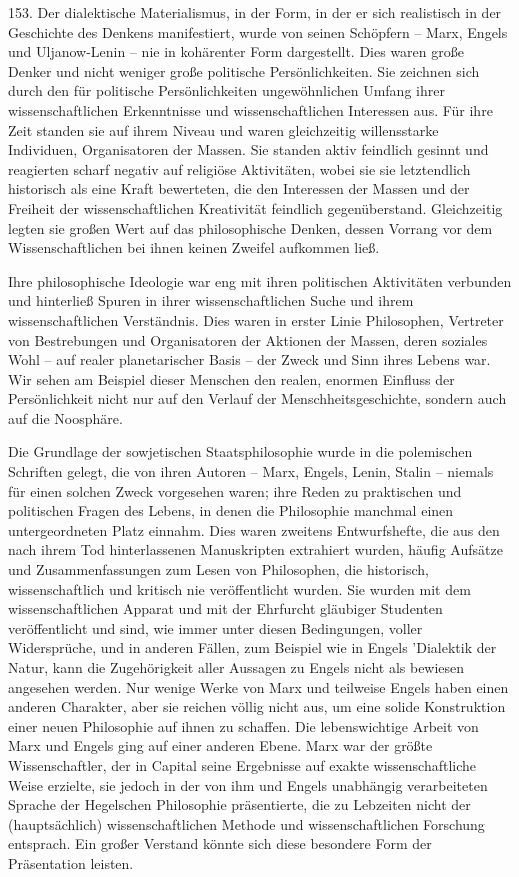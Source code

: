 \documentclass[11pt,a4paper]{book}
\begin{document}
153. Der dialektische Materialismus, in der Form, in der er sich realistisch in der Geschichte des Denkens manifestiert, wurde von seinen Schöpfern -- Marx, Engels und Uljanow-Lenin -- nie in kohärenter Form dargestellt. Dies waren große Denker und nicht weniger große politische Persönlichkeiten. Sie zeichnen sich durch den für politische Persönlichkeiten ungewöhnlichen Umfang ihrer wissenschaftlichen Erkenntnisse und wissenschaftlichen Interessen aus. Für ihre Zeit standen sie auf ihrem Niveau und waren gleichzeitig willensstarke Individuen, Organisatoren der Massen. Sie standen aktiv feindlich gesinnt und reagierten scharf negativ auf religiöse Aktivitäten, wobei sie sie letztendlich historisch als eine Kraft bewerteten, die den Interessen der Massen und der Freiheit der wissenschaftlichen Kreativität feindlich gegenüberstand. Gleichzeitig legten sie großen Wert auf das philosophische Denken, dessen Vorrang vor dem Wissenschaftlichen bei ihnen keinen Zweifel aufkommen ließ.



Ihre philosophische Ideologie war eng mit ihren politischen Aktivitäten verbunden und hinterließ Spuren in ihrer wissenschaftlichen Suche und ihrem wissenschaftlichen Verständnis. Dies waren in erster Linie Philosophen, Vertreter von Bestrebungen und Organisatoren der Aktionen der Massen, deren soziales Wohl -- auf realer planetarischer Basis -- der Zweck und Sinn ihres Lebens war. Wir sehen am Beispiel dieser Menschen den realen, enormen Einfluss der Persönlichkeit nicht nur auf den Verlauf der Menschheitsgeschichte, sondern auch auf die Noosphäre.



Die Grundlage der sowjetischen Staatsphilosophie wurde in die polemischen Schriften gelegt, die von ihren Autoren -- Marx, Engels, Lenin, Stalin -- niemals für einen solchen Zweck vorgesehen waren; ihre Reden zu praktischen und politischen Fragen des Lebens, in denen die Philosophie manchmal einen untergeordneten Platz einnahm. Dies waren zweitens Entwurfshefte, die aus den nach ihrem Tod hinterlassenen Manuskripten extrahiert wurden, häufig Aufsätze und Zusammenfassungen zum Lesen von Philosophen, die historisch, wissenschaftlich und kritisch nie veröffentlicht wurden. Sie wurden mit dem wissenschaftlichen Apparat und mit der Ehrfurcht gläubiger Studenten veröffentlicht und sind, wie immer unter diesen Bedingungen, voller Widersprüche, und in anderen Fällen, zum Beispiel wie in Engels 'Dialektik der Natur, kann die Zugehörigkeit aller Aussagen zu Engels nicht als bewiesen angesehen werden. Nur wenige Werke von Marx und teilweise Engels haben einen anderen Charakter, aber sie reichen völlig nicht aus, um eine solide Konstruktion einer neuen Philosophie auf ihnen zu schaffen. Die lebenswichtige Arbeit von Marx und Engels ging auf einer anderen Ebene. Marx war der größte Wissenschaftler, der in Capital seine Ergebnisse auf exakte wissenschaftliche Weise erzielte, sie jedoch in der von ihm und Engels unabhängig verarbeiteten Sprache der Hegelschen Philosophie präsentierte, die zu Lebzeiten nicht der (hauptsächlich) wissenschaftlichen Methode und wissenschaftlichen Forschung entsprach. Ein großer Verstand könnte sich diese besondere Form der Präsentation leisten.
\end{document}
